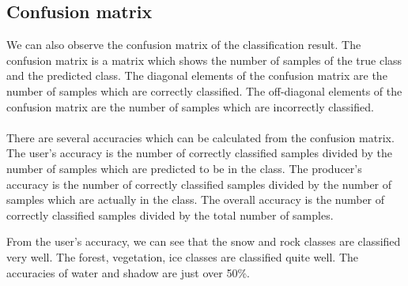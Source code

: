 \documentclass[12pt
,headinclude
,headsepline
,bibtotocnumbered
]{scrartcl}
\begin{document}
\subsection*{Confusion matrix}
We can also observe the confusion matrix of the classification result. The confusion matrix is a matrix which shows the number of samples of the true class and the predicted class. The diagonal elements of the confusion matrix are the number of samples which are correctly classified. The off-diagonal elements of the confusion matrix are the number of samples which are incorrectly classified.
\\\\
There are several accuracies which can be calculated from the confusion matrix. The user's accuracy is the number of correctly classified samples divided by the number of samples which are predicted to be in the class. The producer's accuracy is the number of correctly classified samples divided by the number of samples which are actually in the class. The overall accuracy is the number of correctly classified samples divided by the total number of samples.
\begin{table}[H]
    \renewcommand\arraystretch{1.5}
\end{table}
From the user's accuracy, we can see that the snow and rock classes are classified very well. The forest, vegetation, ice classes are classified quite well. The accuracies of water and shadow are just over 50\%.
\end{document}
